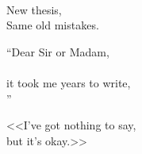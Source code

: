%
%
\newpage
\ %
\begin{flushright}
  \glqq New thesis,\phantom{\grqq.}\\
  Same old mistakes\grqq.
\end{flushright}
\vspace*{7cm}
``Dear Sir or Madam,\\ [-0.5em]
\hspace*{0.4\textwidth}\\ [-0.5em]
\phantom{``}it took me years to write, \\ [-0.5em]
\hspace*{0.4\textwidth}''\\ [-0.5em]
\vspace*{7cm}
\begin{flushright}
  <<I've got nothing to say,\phantom{.''}\\
  but it's okay.>>
\end{flushright}

\newpage

